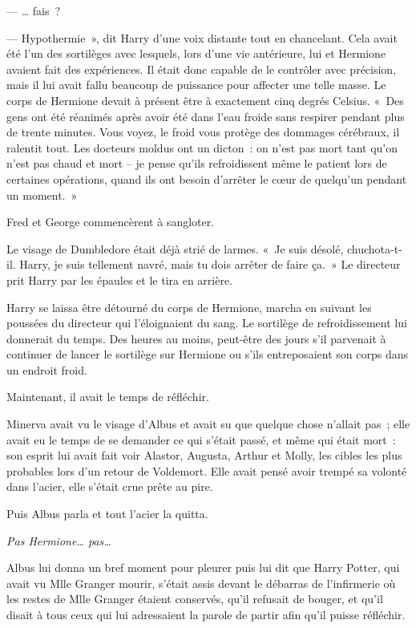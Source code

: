 --- … fais~?

--- Hypothermie~», dit Harry d'une voix distante tout en chancelant.
Cela avait été l'un des sortilèges avec lesquels, lors d'une vie antérieure, lui et Hermione avaient fait des expériences.
Il était donc capable de le contrôler avec précision, mais il lui avait fallu beaucoup de puissance pour affecter une telle masse.
Le corps de Hermione devait à présent être à exactement cinq degrés Celsius.
«~Des gens ont été réanimés après avoir été dans l'eau froide sans respirer pendant plus de trente minutes.
Vous voyez, le froid vous protège des dommages cérébraux, il ralentit tout.
Les docteurs moldus ont un dicton~: on n'est pas mort tant qu'on n'est pas chaud et mort -- je pense qu'ils refroidissent même le patient lors de certaines opérations, quand ils ont besoin d'arrêter le cœur de quelqu'un pendant un moment.~»

Fred et George commencèrent à sangloter.

Le visage de Dumbledore était déjà strié de larmes.
«~Je suis désolé, chuchota-t-il.
Harry, je suis tellement navré, mais tu dois arrêter de faire ça.~»
Le directeur prit Harry par les épaules et le tira en arrière.

Harry se laissa être détourné du corps de Hermione, marcha en suivant les poussées du directeur qui l'éloignaient du sang.
Le sortilège de refroidissement lui donnerait du temps.
Des heures au moins, peut-être des jours s'il parvenait à continuer de lancer le sortilège sur Hermione ou s'ils entreposaient son corps dans un endroit froid.

Maintenant, il avait le temps de réfléchir.

\later

Minerva avait vu le visage d'Albus et avait su que quelque chose n'allait pas~; elle avait eu le temps de se demander ce qui s'était passé, et même qui était mort~: son esprit lui avait fait voir Alastor, Augusta, Arthur et Molly, les cibles les plus probables lors d'un retour de Voldemort.
Elle avait pensé avoir trempé sa volonté dans l'acier, elle s'était crue prête au pire.

Puis Albus parla et tout l'acier la quitta.

\emph{Pas Hermione… pas…}

Albus lui donna un bref moment pour pleurer puis lui dit que Harry Potter, qui avait vu Mlle Granger mourir, s'était assis devant le débarras de l'infirmerie où les restes de Mlle Granger étaient conservés, qu'il refusait de bouger, et qu'il disait à tous ceux qui lui adressaient la parole de partir afin qu'il puisse réfléchir.

